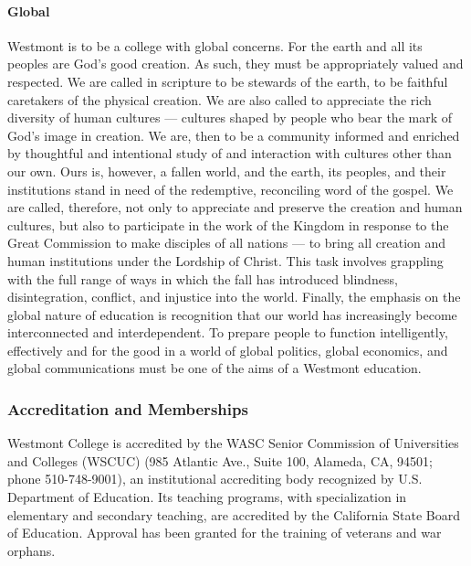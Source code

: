			\paragraph{Global}
				Westmont is to be a college with global concerns.  For the earth and all its peoples are God's good
				creation.  As such, they must be appropriately valued and respected.  We are called in scripture to be
				stewards of the earth, to be faithful caretakers of the physical creation.  We are also called to appreciate
				the rich diversity of human cultures --- cultures shaped by people who bear the mark of God's image in
				creation.  We are, then to be a community informed and enriched by thoughtful and intentional study of and
				interaction with cultures other than our own.  Ours is, however, a fallen world, and the earth, its peoples,
				and their institutions stand in need of the redemptive, reconciling word of the gospel.  We are called,
				therefore, not only to appreciate and preserve the creation and human cultures, but also to participate in
				the work of the Kingdom in response to the Great Commission to make disciples of all nations --- to bring
				all creation and human institutions under the Lordship of Christ.  This task involves grappling with the
				full range of ways in which the fall has introduced blindness, disintegration, conflict, and injustice into
				the world.  Finally, the emphasis on the global nature of education is recognition that our world has
				increasingly become interconnected and interdependent.  To prepare people to function intelligently,
				effectively and for the good in a world of global politics, global economics, and global communications must
				be one of the aims of a Westmont education.

		\subsubsection{Accreditation and Memberships}
			\label{sec:AccreditationAndMemberships}

			Westmont College is accredited by the WASC Senior Commission of Universities and Colleges (WSCUC) (985
			Atlantic Ave., Suite 100, Alameda, CA, 94501; phone 510-748-9001), an institutional accrediting body
			recognized by U.S. Department of Education.  Its teaching programs, with specialization in elementary and
			secondary teaching, are accredited by the California State Board of Education. Approval has been granted for
			the training of veterans and war orphans.

